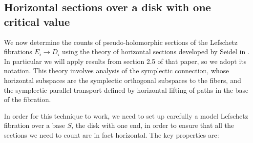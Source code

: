 \documentclass[12pt]{amsart}
\begin{document}


\subsection{Horizontal sections over a disk with one critical value}
\label{sec:horiz-sections}

We now determine the counts of pseudo-holomorphic sections of the
Lefschetz fibrations $E_i \to D_i$ using the theory of horizontal
sections developed by Seidel in \cite{seidel-les}. In particular we
will apply results from section 2.5 of that paper, so we adopt its
notation. This theory involves analysis of the symplectic connection, whose horizontal subspaces are the symplectic orthogonal subspaces to the fibers, and the symplectic parallel transport defined by horizontal lifting of paths in the base of the fibration.

In order for this technique to work, we need to set up carefully a
model Lefschetz fibration over a base $S$, the disk with one end, in
order to ensure that all the sections we need to count are in fact
horizontal. The key properties are:
\end{document}
